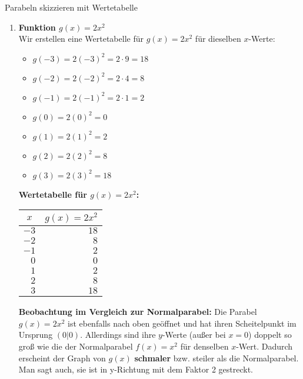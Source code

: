 \begin{loesungsumgebung}{Parabeln skizzieren mit Wertetabelle}
\begin{enumerate}[label=(\alph*)]
    \item \textbf{Funktion $g(x)=2x^2$} \\
    Wir erstellen eine Wertetabelle für $g(x)=2x^2$ für dieselben $x$-Werte:
    \begin{itemize}
        \item $g(-3) = 2(-3)^2 = 2 \cdot 9 = 18$
        \item $g(-2) = 2(-2)^2 = 2 \cdot 4 = 8$
        \item $g(-1) = 2(-1)^2 = 2 \cdot 1 = 2$
        \item $g(0) = 2(0)^2 = 0$
        \item $g(1) = 2(1)^2 = 2$
        \item $g(2) = 2(2)^2 = 8$
        \item $g(3) = 2(3)^2 = 18$
    \end{itemize}
    \textbf{Wertetabelle für $g(x)=2x^2$:}
    \begin{center}
    \begin{tabular}{r r}
    \toprule
    \multicolumn{1}{c}{$x$} & \multicolumn{1}{c}{$g(x)=2x^2$} \\
    \midrule
    $-3$ & $18$ \\
    $-2$ & $8$ \\
    $-1$ & $2$ \\
    $0$ & $0$ \\
    $1$ & $2$ \\
    $2$ & $8$ \\
    $3$ & $18$ \\
    \bottomrule
    \end{tabular}
    \end{center}
    \textbf{Beobachtung im Vergleich zur Normalparabel:}
    Die Parabel $g(x)=2x^2$ ist ebenfalls nach oben geöffnet und hat ihren Scheitelpunkt im Ursprung $(0|0)$. Allerdings sind ihre $y$-Werte (außer bei $x=0$) doppelt so groß wie die der Normalparabel $f(x)=x^2$ für denselben $x$-Wert. Dadurch erscheint der Graph von $g(x)$ \textbf{schmaler} bzw. steiler als die Normalparabel. Man sagt auch, sie ist in y-Richtung mit dem Faktor 2 gestreckt.


\end{enumerate}
\end{loesungsumgebung}
